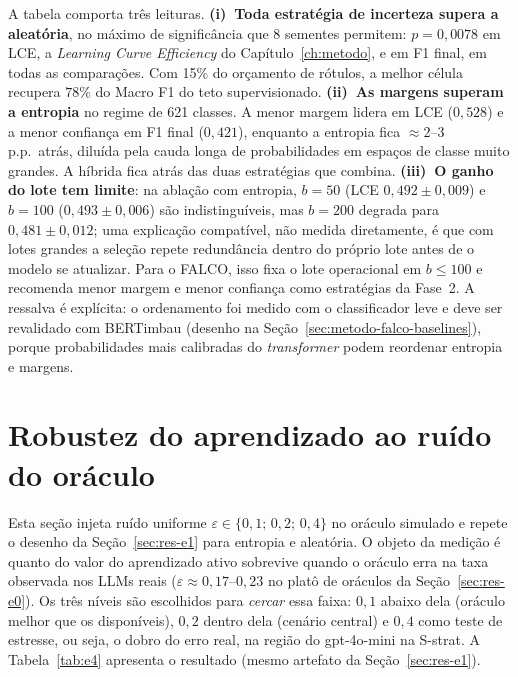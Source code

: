 A tabela comporta três leituras. \textbf{(i)~Toda estratégia de incerteza supera a aleatória}, no máximo de
significância que 8 sementes permitem: $p=0{,}0078$ em LCE, a \textit{Learning
Curve Efficiency} do Capítulo~\ref{ch:metodo}, e em F1 final, em todas as
comparações. Com 15\% do orçamento de rótulos, a melhor célula recupera $78\%$
do Macro F1 do teto supervisionado.
\textbf{(ii)~As margens superam a entropia} no regime de 621 classes. A menor
margem lidera em LCE ($0{,}528$) e a menor confiança em F1 final ($0{,}421$),
enquanto a entropia fica $\approx 2$--$3$ p.p.\ atrás, diluída pela cauda longa
de probabilidades em espaços de classe muito grandes. A híbrida fica atrás das
duas estratégias que combina. \textbf{(iii)~O ganho do lote tem limite}: na
ablação com entropia, $b=50$ (LCE $0{,}492 \pm 0{,}009$) e $b=100$
($0{,}493 \pm 0{,}006$) são indistinguíveis, mas $b=200$ degrada para
$0{,}481 \pm 0{,}012$; uma explicação compatível, não medida diretamente, é
que com lotes grandes a seleção repete redundância dentro do próprio lote
antes de o modelo se atualizar. Para o FALCO, isso fixa o lote operacional em $b \le 100$ e recomenda menor
margem e menor confiança como estratégias da Fase~2. A ressalva é explícita: o
ordenamento foi medido com o classificador leve e deve ser revalidado com
BERTimbau (desenho na Seção~\ref{sec:metodo-falco-baselines}), porque
probabilidades mais calibradas do \textit{transformer} podem reordenar
entropia e margens.

\section{Robustez do aprendizado ao ruído do oráculo}
\label{sec:res-e4}

Esta seção injeta ruído uniforme $\varepsilon \in \{0{,}1;\, 0{,}2;\, 0{,}4\}$ no
oráculo simulado e repete o desenho da Seção~\ref{sec:res-e1} para entropia e
aleatória. O
objeto da medição é quanto do valor do aprendizado ativo sobrevive quando o oráculo
erra na taxa observada nos LLMs reais ($\varepsilon \approx 0{,}17$--$0{,}23$
no platô de oráculos da Seção~\ref{sec:res-e0}). Os três níveis são escolhidos para \emph{cercar} essa faixa:
$0{,}1$ abaixo dela (oráculo melhor que os disponíveis), $0{,}2$ dentro dela
(cenário central) e $0{,}4$ como teste de estresse, ou seja, o dobro do erro
real, na região do gpt-4o-mini na S-strat.
A Tabela~\ref{tab:e4} apresenta o resultado
(mesmo artefato da Seção~\ref{sec:res-e1}).


